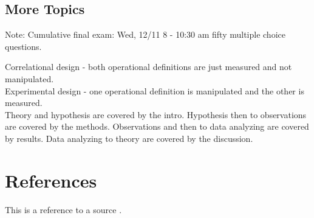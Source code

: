 \documentclass{report}
\begin{document}
\section{More Topics}

Note: Cumulative final exam: Wed, 12/11 8 - 10:30 am fifty multiple choice questions.

Correlational design - both operational definitions are just measured 
and not manipulated. \\
Experimental design - one operational definition is manipulated and the other is 
measured. \\

Theory and hypothesis are covered by the intro. Hypothesis then to observations are covered by the methods.
Observations and then to data analyzing are covered by results. Data analyzing to theory 
are covered by the discussion. \\ 



\chapter{References}
This is a reference to a source \cite{example}.



\end{document}
